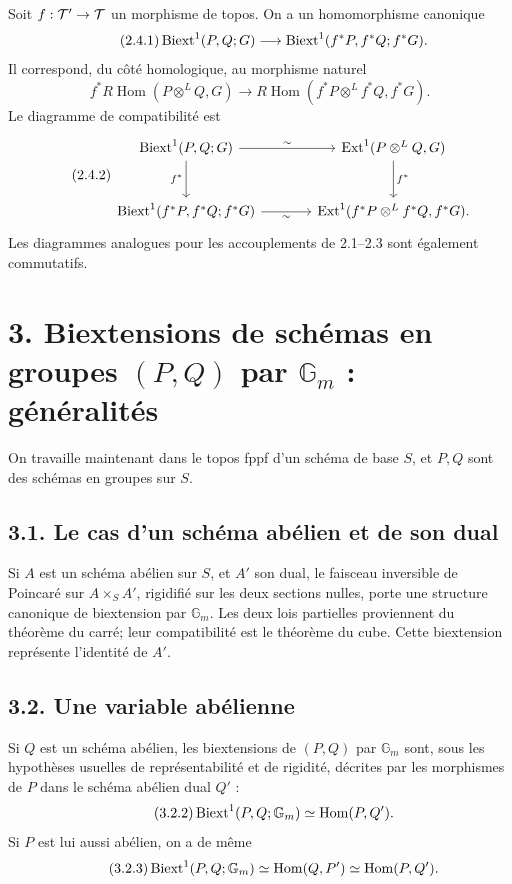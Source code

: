 \documentclass[11pt]{article}
\providecommand{\Gm}{\mathbb G_m}
\providecommand{\Hom}{\operatorname{Hom}}
\providecommand{\Ext}{\operatorname{Ext}}
\begin{document}
Soit \(f:\mathcal T'\to\mathcal T\) un morphisme de topos.  On a un homomorphisme canonique
\begin{equation}\tag{2.4.1}
        \operatorname{Biext}^1(P,Q;G)\longrightarrow
        \operatorname{Biext}^1(f^*P,f^*Q;f^*G).
\end{equation}
Il correspond, du côté homologique, au morphisme naturel
\[
        f^*R\!\Hom(P\otimes^LQ,G)\to
        R\!\Hom(f^*P\otimes^Lf^*Q,f^*G).
\]
Le diagramme de compatibilité est
\begin{equation}\tag{2.4.2}
\begin{tikzcd}[column sep=large,row sep=large]
\Biext^1(P,Q;G)\arrow[r,"\sim"]\arrow[d,"f^*"']&\Ext^1(P\otimes^LQ,G)\arrow[d,"f^*"]\\
\Biext^1(f^*P,f^*Q;f^*G)\arrow[r,"\sim"']&\Ext^1(f^*P\otimes^Lf^*Q,f^*G).
\end{tikzcd}
\end{equation}
Les diagrammes analogues pour les accouplements de 2.1--2.3 sont également commutatifs.

\section*{3. Biextensions de schémas en groupes \((P,Q)\) par \(\Gm\) : généralités}

On travaille maintenant dans le topos fppf d'un schéma de base \(S\), et \(P,Q\) sont des schémas en groupes sur \(S\).

\subsection*{3.1. Le cas d'un schéma abélien et de son dual}

Si \(A\) est un schéma abélien sur \(S\), et \(A'\) son dual, le faisceau inversible de Poincaré sur \(A\times_SA'\), rigidifié sur les deux sections nulles, porte une structure canonique de biextension par \(\Gm\).  Les deux lois partielles proviennent du théorème du carré; leur compatibilité est le théorème du cube.  Cette biextension représente l'identité de \(A'\).

\subsection*{3.2. Une variable abélienne}

Si \(Q\) est un schéma abélien, les biextensions de \((P,Q)\) par \(\Gm\) sont, sous les hypothèses usuelles de représentabilité et de rigidité, décrites par les morphismes de \(P\) dans le schéma abélien dual \(Q'\) :
\begin{equation}\tag{3.2.2}
        \Biext^1(P,Q;\Gm)\simeq \Hom(P,Q').
\end{equation}
Si \(P\) est lui aussi abélien, on a de même
\begin{equation}\tag{3.2.3}
        \Biext^1(P,Q;\Gm)\simeq \Hom(Q,P')\simeq \Hom(P,Q').
\end{equation}
\end{document}
